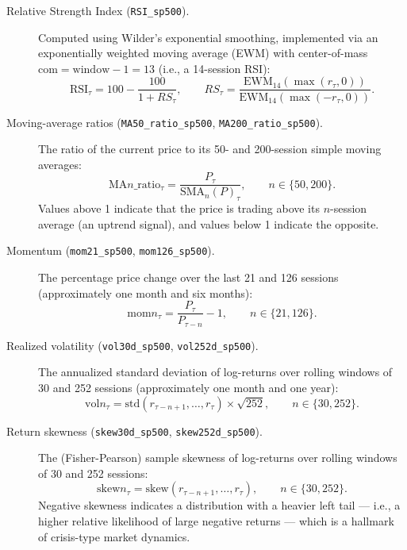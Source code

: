 \begin{description}
  \item[Relative Strength Index (\texttt{RSI\_sp500}).] Computed using
  Wilder's exponential smoothing, implemented via an exponentially
  weighted moving average (EWM) with center-of-mass $\mathrm{com} =
  \mathrm{window} - 1 = 13$ (i.e., a 14-session RSI):
  \begin{equation}
    \label{eq:rsi}
    \mathrm{RSI}_\tau = 100 - \frac{100}{1 + RS_\tau}, \qquad
    RS_\tau = \frac{\mathrm{EWM}_{14}(\max(r_\tau, 0))}{\mathrm{EWM}_{14}(\max(-r_\tau, 0))}.
  \end{equation}

  \item[Moving-average ratios (\texttt{MA50\_ratio\_sp500},
  \texttt{MA200\_ratio\_sp500}).] The ratio of the current price to its
  50- and 200-session simple moving averages:
  \begin{equation}
    \label{eq:ma-ratio}
    \mathrm{MA}n\_\mathrm{ratio}_\tau = \frac{P_\tau}{\mathrm{SMA}_n(P)_\tau},
    \qquad n \in \{50, 200\}.
  \end{equation}
  Values above 1 indicate that the price is trading above its $n$-session
  average (an uptrend signal), and values below 1 indicate the opposite.

  \item[Momentum (\texttt{mom21\_sp500}, \texttt{mom126\_sp500}).] The
  percentage price change over the last 21 and 126 sessions
  (approximately one month and six months):
  \begin{equation}
    \label{eq:momentum}
    \mathrm{mom}n_\tau = \frac{P_\tau}{P_{\tau-n}} - 1, \qquad n \in \{21, 126\}.
  \end{equation}

  \item[Realized volatility (\texttt{vol30d\_sp500}, \texttt{vol252d\_sp500}).]
  The annualized standard deviation of log-returns over rolling windows of
  30 and 252 sessions (approximately one month and one year):
  \begin{equation}
    \label{eq:realized-vol}
    \mathrm{vol}n_\tau = \mathrm{std}\left(r_{\tau-n+1}, \dots, r_\tau\right)
    \times \sqrt{252}, \qquad n \in \{30, 252\}.
  \end{equation}

  \item[Return skewness (\texttt{skew30d\_sp500}, \texttt{skew252d\_sp500}).]
  The (Fisher-Pearson) sample skewness of log-returns over rolling windows
  of 30 and 252 sessions:
  \begin{equation}
    \label{eq:skewness}
    \mathrm{skew}n_\tau = \mathrm{skew}\left(r_{\tau-n+1}, \dots, r_\tau\right),
    \qquad n \in \{30, 252\}.
  \end{equation}
  Negative skewness indicates a distribution with a heavier left tail ---
  i.e., a higher relative likelihood of large negative returns --- which
  is a hallmark of crisis-type market dynamics.
\end{description}

